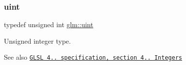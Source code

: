 \subsubsection{\texorpdfstring{uint}{uint}}
{\footnotesize\ttfamily typedef unsigned int \hyperlink{group__core__precision_ga4fd29415871152bfb5abd588334147c8}{glm\+::uint}}

Unsigned integer type.

\begin{DoxySeeAlso}{See also}
\href{http://www.opengl.org/registry/doc/GLSLangSpec.4.20.8.pdf}{\tt G\+L\+SL 4.. specification, section 4.. Integers} 
\end{DoxySeeAlso}
